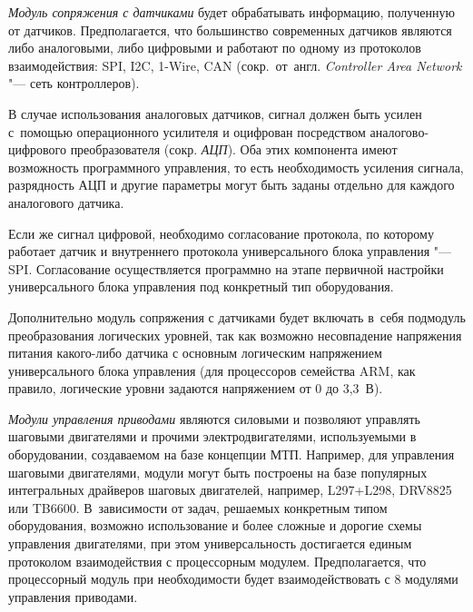 \textit{Модуль сопряжения с датчиками} будет обрабатывать информацию, полученную от датчиков. Предполагается, что большинство современных датчиков являются либо аналоговыми, либо цифровыми и работают по одному из протоколов взаимодействия: \foreignlanguage{english}{SPI}, \foreignlanguage{english}{I}2\foreignlanguage{english}{C}, 1-\foreignlanguage{english}{Wire}, \foreignlanguage{english}{CAN} (сокр.~от~англ. \textit{Controller Area Network} "--- сеть контроллеров).

В случае использования аналоговых датчиков, сигнал должен быть усилен с~помощью операционного усилителя и оцифрован посредством аналогово-цифрового преобразователя (сокр. \textit{АЦП}). Оба этих компонента имеют возможность программного управления, то есть необходимость усиления сигнала, разрядность АЦП и другие параметры могут быть заданы отдельно для каждого аналогового датчика.

Если же сигнал цифровой, необходимо согласование протокола, по которому работает датчик и внутреннего протокола универсального блока управления "--- \foreignlanguage{english}{SPI}. Согласование осуществляется программно на этапе первичной настройки универсального блока управления под конкретный тип оборудования.

Дополнительно модуль сопряжения с датчиками будет включать в~себя подмодуль преобразования логических уровней, так как возможно несовпадение напряжения питания какого-либо датчика с основным логическим напряжением универсального блока управления (для процессоров семейства \foreignlanguage{english}{ARM}, как правило, логические уровни задаются напряжением от 0 до 3,3~В).

\textit{Модули управления приводами} являются силовыми и позволяют управлять шаговыми двигателями и прочими электродвигателями, используемыми в оборудовании, создаваемом на базе концепции \foreignlanguage{english}{МТП}. Например, для управления шаговыми двигателями, модули могут быть построены на базе популярных интегральных драйверов шаговых двигателей, например, \foreignlanguage{english}{L}297+\foreignlanguage{english}{L}298, \foreignlanguage{english}{DRV}8825 или \foreignlanguage{english}{TB}6600. В~зависимости от задач, решаемых конкретным типом оборудования, возможно использование и более сложные и дорогие схемы управления двигателями, при этом универсальность достигается единым протоколом взаимодействия с процессорным модулем. Предполагается, что процессорный модуль при необходимости будет взаимодействовать с 8 модулями управления приводами.

